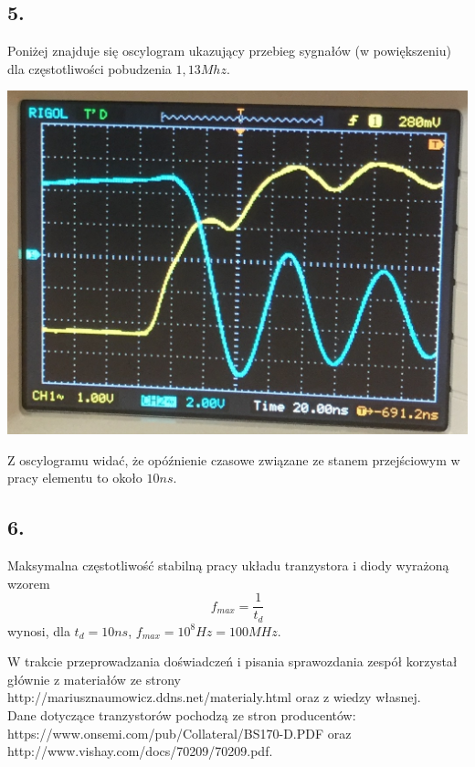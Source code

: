 \documentclass[polish,a4paper]{article}
\begin{document}
\newpage

\subsection*{5.}
Poniżej znajduje się oscylogram ukazujący przebieg sygnałów (w powiększeniu) dla częstotliwości pobudzenia $1,13Mhz$.\\
\begin{center}
\includegraphics[scale=0.4]{oscylogram}
\end{center}

Z oscylogramu widać, że opóźnienie czasowe związane ze stanem przejściowym w pracy elementu to około $10ns$. 

\subsection*{6.}

Maksymalna częstotliwość stabilną pracy układu tranzystora i diody wyrażoną wzorem 
$$
f_{max} = \frac{1}{t_d}
$$
wynosi, dla $t_d = 10ns$, $f_{max} = 10^8 Hz = 100 MHz$.



\begin{thebibliography}{9}

  W trakcie przeprowadzania doświadczeń i pisania sprawozdania zespół korzystał głównie z materiałów ze strony http://mariusznaumowicz.ddns.net/materialy.html oraz z wiedzy własnej.\\
Dane dotyczące tranzystorów pochodzą ze stron producentów: https://www.onsemi.com/pub/Collateral/BS170-D.PDF oraz http://www.vishay.com/docs/70209/70209.pdf.

\end{thebibliography}
\end{document}
